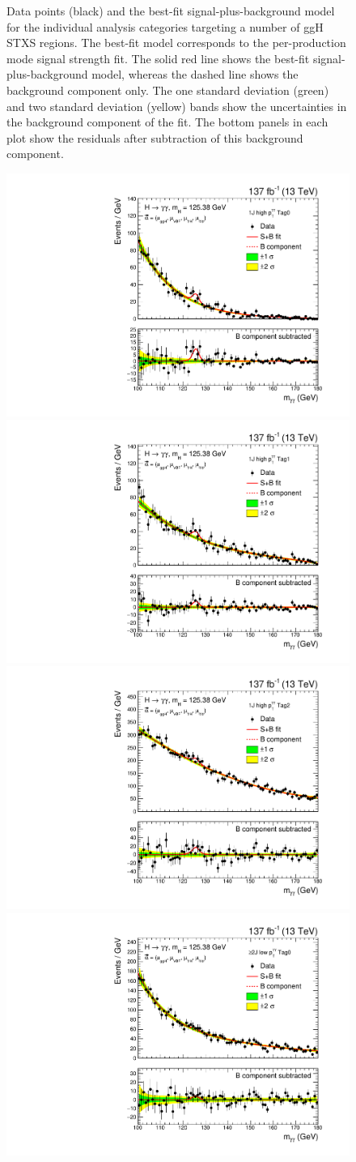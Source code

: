 \begin{figure}[htbp]
  \caption[Observed diphoton mass distributions: ggH 0J and ggH 1J]
  {
    Data points (black) and the best-fit signal-plus-background model for the individual analysis categories targeting a number of ggH STXS regions. The best-fit model corresponds to the per-production mode signal strength fit. The solid red line shows the best-fit signal-plus-background model, whereas the dashed line shows the background component only. The one standard deviation (green) and two standard deviation (yellow) bands show the uncertainties in the background component of the fit. The bottom panels in each plot show the residuals after subtraction of this background component.
  }
  \label{fig:diphoton_mass_0}
\end{figure}

\begin{figure}[htbp]
  \centering
  \includegraphics[width=.32\linewidth]{Figures/app_sb_models/RECO_1J_PTH_120_200_Tag0_CMS_hgg_mass.pdf}
  \includegraphics[width=.32\linewidth]{Figures/app_sb_models/RECO_1J_PTH_120_200_Tag1_CMS_hgg_mass.pdf}
  \includegraphics[width=.32\linewidth]{Figures/app_sb_models/RECO_1J_PTH_120_200_Tag2_CMS_hgg_mass.pdf}
  \includegraphics[width=.32\linewidth]{Figures/app_sb_models/RECO_GE2J_PTH_0_60_Tag0_CMS_hgg_mass.pdf}

\end{figure}
